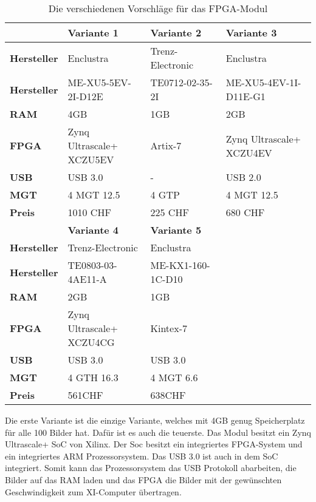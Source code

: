 \begin{table}[tb]
    \centering
    \caption{Die verschiedenen Vorschläge für das FPGA-Modul}
    \begin{tabular}{|l|l|l|l|}
        \hline
        & \textbf{Variante 1} & \textbf{Variante 2} & \textbf{Variante 3} \\ \hline

        \textbf{Hersteller} & Enclustra & Trenz-Electronic & Enclustra \\ \hline
        \textbf{Hersteller} & ME-XU5-5EV-2I-D12E & TE0712-02-35-2I & ME-XU5-4EV-1I-D11E-G1 \\ \hline
        \textbf{RAM} & 4GB & 1GB & 2GB \\ \hline
        \textbf{FPGA} &\pbox[t]{10cm}{Zynq Ultrascale+\\XCZU5EV\vphantom{g}} & Artix-7 &\pbox[t]{10cm}{Zynq Ultrascale+\\XCZU4EV \vphantom{g}} \\ \hline
        \textbf{USB} & USB 3.0 & - & USB 2.0 \\ \hline
        \textbf{MGT} & 4 MGT 12.5 & 4 GTP & 4 MGT 12.5  \\ \hline
        \textbf{Preis} & 1010 CHF & 225 CHF & 680 CHF \\ \hline

        \hline
        & \textbf{Variante 4} & \textbf{Variante 5} & \\ \hline
        \textbf{Hersteller} & Trenz-Electronic & Enclustra & \\ \hline
        \textbf{Hersteller} & TE0803-03-4AE11-A & ME-KX1-160-1C-D10 & \\ \hline
        \textbf{RAM} & 2GB & 1GB & \\ \hline
        \textbf{FPGA} &\pbox[t]{10cm}{Zynq Ultrascale+\\XCZU4CG\vphantom{g}} & Kintex-7 & \\ \hline
        \textbf{USB} & USB 3.0 & USB 3.0 & \\ \hline
        \textbf{MGT} & 4 GTH 16.3 & 4 MGT 6.6 & \\ \hline
        \textbf{Preis} & 561CHF & 638CHF & \\ \hline
    \end{tabular}

        
    \label{tab:modulVarianten}
    \end{table}

    Die erste Variante ist die einzige Variante, welches mit 4GB genug Speicherplatz für alle 100 Bilder hat. Dafür ist es auch die teuerste. Das Modul besitzt ein Zynq Ultrascale+ SoC von Xilinx. Der Soc besitzt ein integriertes FPGA-System und ein integriertes ARM Prozessorsystem. Das USB 3.0 ist auch in dem SoC integriert. Somit kann das Prozessorsystem das USB Protokoll abarbeiten, die Bilder auf das RAM laden und das FPGA die Bilder mit der gewünschten Geschwindigkeit zum XI-Computer übertragen.
    
